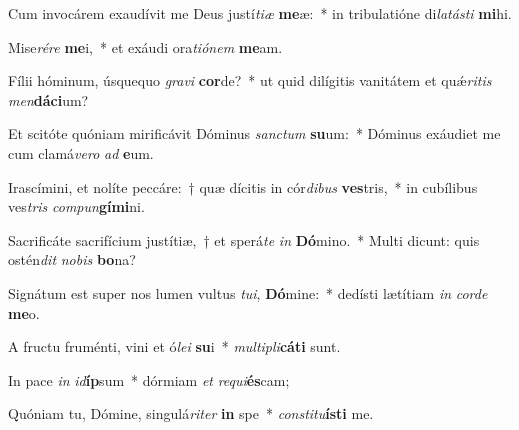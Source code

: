 \item Cum invocárem exaudívit me Deus justí\textit{ti}\textit{æ} \textbf{me}æ:~* in tribulatióne di\textit{la}\textit{tás}\textit{ti} \textbf{mi}hi.
\item Mise\textit{ré}\textit{re} \textbf{me}i,~* et exáudi ora\textit{ti}\textit{ó}\textit{nem} \textbf{me}am.
\item Fílii hóminum, úsquequo \textit{gra}\textit{vi} \textbf{cor}de?~* ut quid dilígitis vanitátem et quǽ\textit{ri}\textit{tis} \textit{men}\textbf{dá}\textbf{ci}um?
\item Et scitóte quóniam mirificávit Dóminus \textit{sanc}\textit{tum} \textbf{su}um:~* Dóminus exáudiet me cum clamá\textit{ve}\textit{ro} \textit{ad} \textbf{e}um.
\item Irascímini, et nolíte peccáre:~† quæ dícitis in cór\textit{di}\textit{bus} \textbf{ves}tris,~* in cubílibus ves\textit{tris} \textit{com}\textit{pun}\textbf{gí}\textbf{mi}ni.
\item Sacrificáte sacrifícium justítiæ,~† et sperá\textit{te} \textit{in} \textbf{Dó}mino.~* Multi dicunt: quis ostén\textit{dit} \textit{no}\textit{bis} \textbf{bo}na?
\item Signátum est super nos lumen vultus \textit{tu}\textit{i}, \textbf{Dó}mine:~* dedísti lætítiam \textit{in} \textit{cor}\textit{de} \textbf{me}o.
\item A fructu fruménti, vini et ó\textit{le}\textit{i} \textbf{su}i~* \textit{mul}\textit{ti}\textit{pli}\textbf{cá}\textbf{ti} sunt.
\item In pace \textit{in} \textit{id}\textbf{íp}sum~* dórmiam \textit{et} \textit{re}\textit{qui}\textbf{és}cam;
\item Quóniam tu, Dómine, singulá\textit{ri}\textit{ter} \textbf{in} spe~* \textit{con}\textit{sti}\textit{tu}\textbf{ís}\textbf{ti} me.
